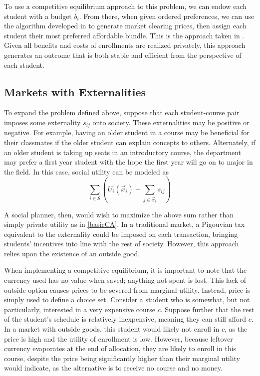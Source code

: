 \documentclass{article}
\begin{document}
To use a competitive equilibrium approach to this problem, we can endow each student with a budget $b_i$. From there, when given ordered preferences, we can use the algorithm developed in \textcite{othman2010} to generate market clearing prices, then assign each student their most preferred affordable bundle. This is the approach taken in \textcite{budish2011}. Given all benefits and costs of enrollments are realized privately, this approach generates an outcome that is both stable and efficient from the perspective of each student.

\subsection{Markets with Externalities}

\label{ext}

To expand the problem defined above, suppose that each student-course pair imposes some externality $s_{ij}$ onto society. These externalities may be positive or negative. For example, having an older student in a course may be beneficial for their classmates if the older student can explain concepts to others. Alternately, if an older student is taking up seats in an introductory course, the department may prefer a first year student with the hope the first year will go on to major in the field. In this case, social utility can be modeled as $$\sum_{i \in \mathcal{S}} \left(U_i(\vec{x}_i) + \sum_{j \in \vec{x}_i} s_{ij} \right)$$

A social planner, then, would wish to maximize the above sum rather than simply private utility as in \ref{basicCA}. In a traditional market, a Pigouvian tax equivalent to the externality could be imposed on each transaction, bringing students' incentives into line with the rest of society. However, this approach relies upon the existence of an outside good.  

When implementing a competitive equilibrium, it is important to note that the currency used has no value when saved; anything not spent is lost. This lack of outside option causes prices to be severed from marginal utility. Instead, price is simply used to define a choice set. Consider a student who is somewhat, but not particularly, interested in a very expensive course $c$. Suppose further that the rest of the student's schedule is relatively inexpensive, meaning they can still afford $c$. In a market with outside goods, this student would likely not enroll in $c$, as the price is high and the utility of enrollment is low. However, because leftover currency evaporates at the end of allocation, they are likely to enroll in this course, despite the price being significantly higher than their marginal utility would indicate, as the alternative is to receive no course and no money.
\end{document}
